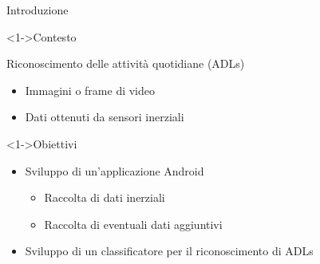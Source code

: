 \begin{tframe}{Introduzione}

    \begin{block}<1->{Contesto}
    
        Riconoscimento delle attività quotidiane (ADLs)

        \begin{itemize}
            \item Immagini o frame di video
            \item Dati ottenuti da sensori inerziali
        \end{itemize}

    \end{block}

    \begin{block}<1->{Obiettivi}
        
        \begin{itemize}
            \item Sviluppo di un'applicazione Android \begin{itemize}
                \item Raccolta di dati inerziali
                \item Raccolta di eventuali dati aggiuntivi
            \end{itemize}
            \item Sviluppo di un classificatore per il riconoscimento di ADLs
        \end{itemize}
        
    \end{block}

\end{tframe}